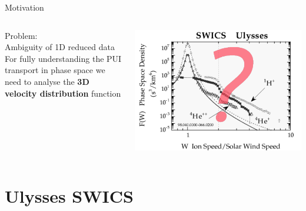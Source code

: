 \documentclass{beamer}
\begin{document}
\begin{frame}{Motivation}
\begin{columns}
	\column[]{5cm}
	Problem: \\ Ambiguity of 1D reduced data
	\\[1cm]
	For fully understanding the PUI transport in phase space we need to analyse the \textbf{3D velocity distribution} function
	
	\column[]{5cm}
	\includegraphics[scale=0.18]{Pics/qm.pdf}
\end{columns}

\section{Ulysses SWICS}
\end{frame}
\end{document}
